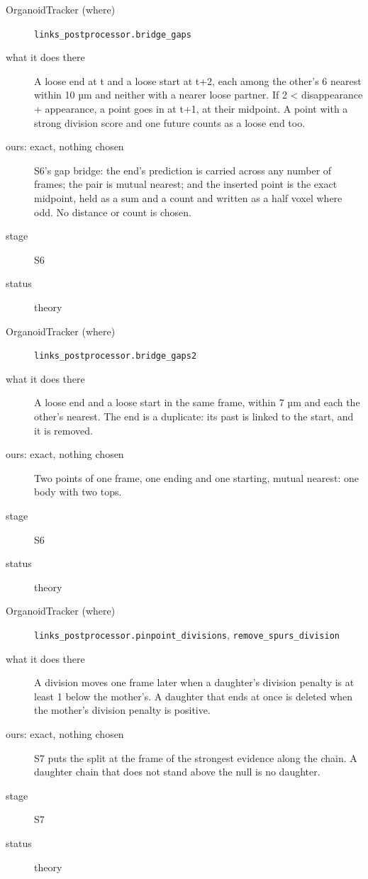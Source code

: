 \begin{description}
\item[{OrganoidTracker (where)}] \texttt{links\_\allowbreak{}postprocessor.\allowbreak{}bridge\_\allowbreak{}gaps}
\item[{what it does there}] A loose end at t and a loose start at t+2, each among the other's 6 nearest within 10 µm and neither with a nearer loose partner. If 2 < disappearance + appearance, a point goes in at t+1, at their midpoint. A point with a strong division score and one future counts as a loose end too.
\item[{ours: exact, nothing chosen}] S6's gap bridge: the end's prediction is carried across any number of frames; the pair is mutual nearest; and the inserted point is the exact midpoint, held as a sum and a count and written as a half voxel where odd. No distance or count is chosen.
\item[{stage}] S6
\item[{status}] theory
\end{description}

\begin{description}
\item[{OrganoidTracker (where)}] \texttt{links\_\allowbreak{}postprocessor.\allowbreak{}bridge\_\allowbreak{}gaps2}
\item[{what it does there}] A loose end and a loose start in the same frame, within 7 µm and each the other's nearest. The end is a duplicate: its past is linked to the start, and it is removed.
\item[{ours: exact, nothing chosen}] Two points of one frame, one ending and one starting, mutual nearest: one body with two tops.
\item[{stage}] S6
\item[{status}] theory
\end{description}

\begin{description}
\item[{OrganoidTracker (where)}] \texttt{links\_\allowbreak{}postprocessor.\allowbreak{}pinpoint\_\allowbreak{}divisions}, \texttt{remove\_\allowbreak{}spurs\_\allowbreak{}division}
\item[{what it does there}] A division moves one frame later when a daughter's division penalty is at least 1 below the mother's. A daughter that ends at once is deleted when the mother's division penalty is positive.
\item[{ours: exact, nothing chosen}] S7 puts the split at the frame of the strongest evidence along the chain. A daughter chain that does not stand above the null is no daughter.
\item[{stage}] S7
\item[{status}] theory
\end{description}

